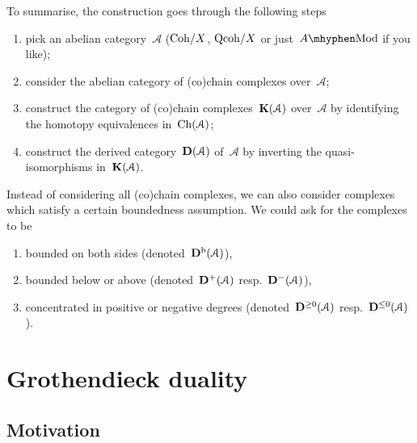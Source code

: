 \documentclass[10pt,a4paper]{article}
\begin{document}
To summarise, the construction goes through the following steps
\begin{enumerate}
  \item pick an abelian category~$\mathcal{A}$ ($\mathrm{Coh}/X$, $\mathrm{Qcoh}/X$ or just~$A\mhyphen\mathrm{Mod}$ if you like);
  \item consider the abelian category of (co)chain complexes over~$\mathcal{A}$;
  \item construct the category of (co)chain complexes~$\mathbf{K}(\mathcal{A})$ over~$\mathcal{A}$ by identifying the homotopy equivalences in~$\operatorname{Ch}(\mathcal{A})$;
  \item construct the derived category~$\mathbf{D}(\mathcal{A})$ of~$\mathcal{A}$ by inverting the quasi-isomorphisms in~$\mathbf{K}(\mathcal{A})$.
\end{enumerate}
Instead of considering all (co)chain complexes, we can also consider complexes which satisfy a certain boundedness assumption. We could ask for the complexes to be
\begin{enumerate}
  \item bounded on both sides (denoted~$\mathbf{D}^{\mathrm{b}}(\mathcal{A})$),
  \item bounded below or above (denoted~$\mathbf{D}^+(\mathcal{A})$ resp.\ $\mathbf{D}^-(\mathcal{A})$),
  \item concentrated in positive or negative degrees (denoted~$\mathbf{D}^{\geq 0}(\mathcal{A})$ resp.\ $\mathbf{D}^{\leq 0}(\mathcal{A})$).
\end{enumerate}

\section{Grothendieck duality}
\label{section:grothendieck-duality}
\subsection{Motivation}
\label{subsection:motivation}
\end{document}

